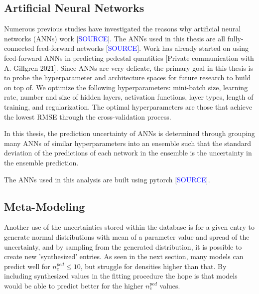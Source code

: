 \documentclass[a4paper, twoside, final, 12pt]{article}
\begin{document}
\subsection{Artificial Neural Networks}

Numerous previous studies have investigated the reasons why artificial neural networks (ANNs) work [\textcolor{blue}{SOURCE}].  The ANNs used in this thesis are all fully-connected feed-forward networks [\textcolor{blue}{SOURCE}]. Work has already started on using feed-forward ANNs in predicting pedestal quantities [Private communication with A. Gillgren 2021]. 
Since ANNs are very delicate, the primary goal in this thesis is to probe the hyperparameter and architecture spaces for future research to build on top of. We optimize the following hyperparameters: mini-batch size, learning rate, number and size of hidden layers, activation functions, layer types, length of training, and regularization. The optimal hyperparameters are those that achieve the lowest RMSE through the cross-validation process.

In this thesis, the prediction uncertainty of ANNs is determined through grouping many ANNs of similar hyperparameters into an ensemble such that the standard deviation of the predictions of each network in the ensemble is the uncertainty in the ensemble prediction.

The ANNs used in this analysis are built using pytorch [\textcolor{blue}{SOURCE}]. 

\subsection{Meta-Modeling}
Another use of the uncertainties stored within the database is for a given entry to generate normal distributions with mean of a parameter value and spread of the uncertainty, and by sampling from the generated distribution, it is possible to create new 'synthesized' entries.
As seen in the next section, many models can predict well for $n_e^{ped} \leq 10$, but struggle for densities higher than that.
By including synthesized values in the fitting procedure the hope is that models would be able to predict better for the higher $n_e^{ped}$ values.
\end{document}
